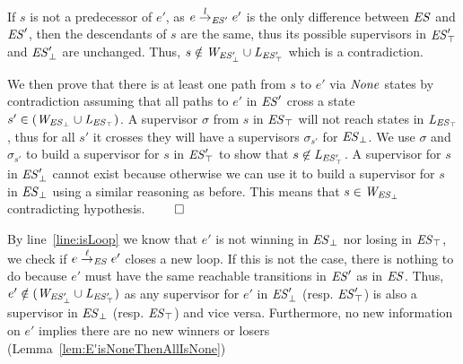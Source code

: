 \begin{Proof Sketch}
If $s$ 
is not a predecessor of $e'$, as $e \overset{l}{\rightarrow}_{\mathit{ES}'} e'$ is the only difference 
between $\mathit{ES}$ and $\mathit{ES}'$, then the descendants of $s$ are the same, 
thus its possible supervisors in $\mathit{\mathit{ES}'_{\top}}$ and 
$\mathit{\mathit{ES}'_{\bot}}$ are unchanged. Thus, $s \notin \mathit{W_{\mathit{\mathit{ES}'_{\bot}}}} \cup 
\mathit{L_{\mathit{\mathit{ES}'_{\top}}}}$ which is a contradiction.

We then prove that there is at least one path from $s$ to $e'$ via $\mathit{None}$ states by 
contradiction assuming that all paths to $e'$ in $\mathit{ES}'$ cross a state $s' \in 
(\mathit{W_{\mathit{\mathit{ES}_{\bot}}}} \cup \mathit{L_{\mathit{\mathit{ES}_{\top}}}})$. A supervisor $\sigma$ from $s$ in 
$\mathit{\mathit{ES}_{\top}}$ will not reach states in $\mathit{L_{\mathit{\mathit{ES}_{\top}}}}$, 
thus for all $s'$ it crosses they will have a supervisors $\sigma_{s'}$ for 
$\mathit{\mathit{ES}_{\bot}}$. We use $\sigma$ and $\sigma_{s'}$  to 
build a supervisor for $s$ in $\mathit{\mathit{ES}'_{\top}}$ to show that $s 
\not\in \mathit{L_{\mathit{\mathit{ES}'_{\top}}}}$.
A supervisor for $s$ in $\mathit{\mathit{ES}'_{\bot}}$ cannot exist because 
otherwise we can use it to build a supervisor for $s$ in 
$\mathit{\mathit{ES}_{\bot}}$ using a similar reasoning as before. This means 
that $s \in 
\mathit{W_{\mathit{\mathit{ES}_{\bot}}}}$ contradicting hypothesis. \hfill$\qed$
\end{Proof Sketch}

By line~\ref{line:isLoop} we know that $e'$ is not winning in  
$\mathit{\mathit{ES}_{\bot}}$ nor losing in 
$\mathit{\mathit{ES}_{\top}}$, we check if $e 
\overset{\ell}{\rightarrow}_{\mathit{ES}} e'$ closes a new loop. If this is not the case, there is nothing to 
do because $e'$ must have 
the same reachable transitions in $\mathit{ES}'$ as in $\mathit{ES}$. Thus, $e' \notin 
(\mathit{W_{\mathit{\mathit{ES}'_{\bot}}}} \cup \mathit{L_{\mathit{\mathit{ES}'_{\top}}}})$ as any supervisor for $e'$ in 
$\mathit{\mathit{ES}'_{\bot}}$ (resp. $\mathit{\mathit{ES}'_{\top}}$) is also a 
supervisor in $\mathit{\mathit{ES}_{\bot}}$ (resp. 
$\mathit{\mathit{ES}_{\top}}$)  and vice versa.  
%
%
Furthermore, no new information on $e'$ implies there are no new winners or 
losers (Lemma~\ref{lem:E'isNoneThenAllIsNone})

